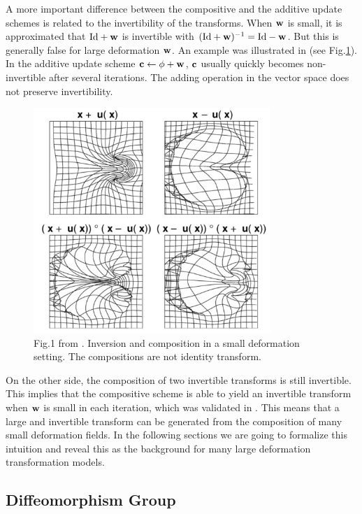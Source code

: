 \documentclass[letterpaper,12pt]{article}
\begin{document}
A more important difference between the compositive and the additive update schemes is related to the invertibility of the transforms. 
When $\mathbf{w}$ is small, it is approximated that $\text{Id}+\mathbf{w}$ is invertible
with $(\text{Id}+\mathbf{w})^{-1}=\text{Id}-\mathbf{w}$. But this is generally false for large deformation $\mathbf{w}$. An example was illustrated in \cite{Ashburner2007} (see Fig.\ref{fig:smallinverse}). 
In the additive update scheme $\mathbf{c} \leftarrow \phi + \mathbf{w}$, $\mathbf{c}$ usually quickly becomes non-invertible after several iterations. The adding operation in the vector space does not preserve invertibility. 

\begin{figure}
\includegraphics[width=0.8\textwidth]{fig/smallinverse}
\caption{\label{fig:smallinverse}
Fig.1 from \cite{Ashburner2007}. Inversion and composition in a small deformation setting. The compositions are not identity transform.
}
\end{figure}


On the other side, the composition of two invertible transforms is still invertible. 
This implies that the compositive scheme is able to yield an invertible transform when $\mathbf{w}$ is small in each iteration, which was validated in \cite{Vercauteren2009}. 
This means that a large and invertible transform can be generated from the composition of many small deformation fields. In the following sections we are going to formalize this intuition and
reveal this as the background for many large deformation transformation models.

\subsection{Diffeomorphism Group}
\label{sec:diffgroup}
\end{document}
